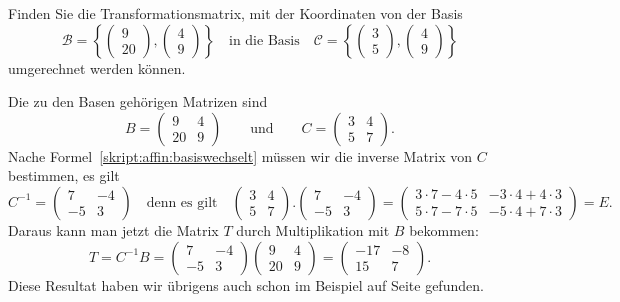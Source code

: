 \begin{beispiel}
Finden Sie die Transformationsmatrix, mit der Koordinaten von der Basis
\[
\mathcal{B}=\left\{
\begin{pmatrix}9\\20\end{pmatrix},
\begin{pmatrix}4\\9\end{pmatrix}
\right\}
\quad\text{in die Basis}\quad
\mathcal{C}=\left\{
\begin{pmatrix}3\\5\end{pmatrix},
\begin{pmatrix}4\\9\end{pmatrix}
\right\}
\]
umgerechnet werden können.

Die zu den Basen gehörigen Matrizen sind
\[
B
=
\begin{pmatrix}9&4\\20&9\end{pmatrix}
\qquad\text{und}\qquad
C
=
\begin{pmatrix}3&4\\5&7\end{pmatrix}.
\]
Nache Formel~\eqref{skript:affin:basiswechselt} müssen wir die inverse
Matrix von $C$ bestimmen, es gilt
\[
C^{-1}
=
\begin{pmatrix}7&-4\\-5&3\end{pmatrix}
\quad\text{denn es gilt}\quad
\begin{pmatrix}3&4\\5&7\end{pmatrix}.
\begin{pmatrix}7&-4\\-5&3\end{pmatrix}
=
\begin{pmatrix}
3\cdot 7-4\cdot 5&-3\cdot 4+4\cdot 3\\
5\cdot 7-7\cdot 5&-5\cdot 4+7\cdot 3
\end{pmatrix}=E.
\]
Daraus kann man jetzt die Matrix $T$ durch Multiplikation mit $B$ bekommen:
\[
T=C^{-1}B = 
\begin{pmatrix}7&-4\\-5&3\end{pmatrix}
\begin{pmatrix}9&4\\20&9\end{pmatrix}
=
\begin{pmatrix}
-17&-8\\
15& 7
\end{pmatrix}.
\]
Diese Resultat haben wir übrigens auch schon im Beispiel auf Seite
\pageref{skript:lingl:simultan-beispiel}
gefunden.
\end{beispiel}

